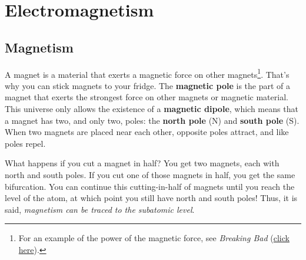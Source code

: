 \documentclass{article}
\begin{document}
\setcounter{section}{21}
\section{Electromagnetism}

\subsection*{Magnetism} \label{24h7hD}

A magnet is a material that exerts a magnetic force on other magnets\footnote{For an example of the power of the magnetic force, see \textit{Breaking Bad} (\href{https://youtu.be/gzCXowhks80?t=4}{click here}).}. That's why you can stick magnets to your fridge. The \textbf{magnetic pole} is the part of a magnet that exerts the strongest force on other magnets or magnetic material. This universe only allows the existence of a \textbf{magnetic dipole}, which means that a magnet has two, and only two, poles: the \textbf{north pole} (N) and \textbf{south pole} (S). When two magnets are placed near each other, opposite poles attract, and like poles repel.

\begin{center}
    \captionsetup{type=figure,margin=1in}
\end{center}


What happens if you cut a magnet in half? You get two magnets, each with north and south poles. If you cut one of those magnets in half, you get the same bifurcation. You can continue this cutting-in-half of magnets until you reach the level of the atom, at which point you still have north and south poles! Thus, it is said, \textit{magnetism can be traced to the subatomic level}.
\end{document}
